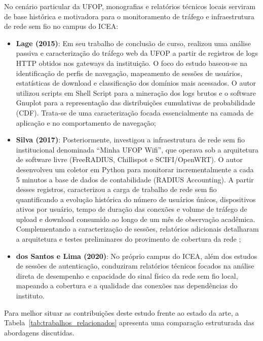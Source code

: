 No cenário particular da \ac{UFOP}, monografias e relatórios técnicos locais serviram de base histórica e motivadora para o monitoramento de tráfego e infraestrutura de rede sem fio no campus do \ac{ICEA}:

\begin{itemize}
	\item \textbf{Lage (2015)}: Em seu trabalho de conclusão de curso,  realizou uma análise passiva e caracterização do tráfego web da \ac{UFOP} a partir de registros de logs HTTP obtidos nos gateways da instituição. O foco do estudo baseou-se na identificação de perfis de navegação, mapeamento de sessões de usuários, estatísticas de download e classificação dos domínios mais acessados. O autor utilizou scripts em Shell Script para a mineração dos logs brutos e o software Gnuplot para a representação das distribuições cumulativas de probabilidade (CDF). Trata-se de uma caracterização focada essencialmente na camada de aplicação e no comportamento de navegação;
	\item \textbf{Silva (2017)}: Posteriormente,  investigou a infraestrutura de rede sem fio institucional denominada ``Minha UFOP Wifi'', que operava sob a arquitetura de software livre (FreeRADIUS, Chillispot e SCIFI/OpenWRT). O autor desenvolveu um coletor em Python para monitorar incrementalmente a cada 5 minutos a base de dados de contabilidade (RADIUS Accounting). A partir desses registros, caracterizou a carga de trabalho de rede sem fio quantificando a evolução histórica do número de usuários únicos, dispositivos ativos por usuário, tempo de duração das conexões e volume de tráfego de upload e download consumido ao longo de um mês de observação acadêmica. Complementando a caracterização de sessões, relatórios adicionais detalharam a arquitetura e testes preliminares do provimento de cobertura da rede \cite{silva2017techrep};
	\item \textbf{dos Santos e Lima (2020)}: No próprio campus do \ac{ICEA}, além dos estudos de sessões de autenticação,  conduziram relatórios técnicos focados na análise direta de desempenho e capacidade do sinal físico da rede sem fio local, mapeando a cobertura e a qualidade das conexões nas dependências do instituto.
\end{itemize}

Para melhor situar as contribuições deste estudo frente ao estado da arte, a Tabela~\ref{tab:trabalhos_relacionados} apresenta uma comparação estruturada das abordagens discutidas.

